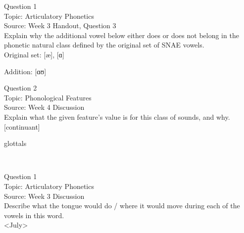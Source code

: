 \documentclass[12pt]{article}
\begin{document}
{\large Question 1}\\

Topic: Articulatory Phonetics\\
Source: Week 3 Handout, Question 3\\

Explain why the additional vowel below either does or does not belong in the phonetic natural class defined by the original set of SNAE vowels.\\

Original set: {[æ]}, {[ɑ]}

Addition: {[ɑʊ]}


\newpage

{\large Question 2}\\

Topic: Phonological Features\\
Source: Week 4 Discussion\\

Explain what the given feature’s value is for this class of sounds, and why.\\

{[continuant]}

glottals


\newpage

\begin{center}
\textbf{{\color{red}{\HUGE END OF EXAM}}}\\

\end{center}
\newpage

\begin{center}
\textbf{{\color{blue}{\HUGE START OF EXAM\\}}}

\textbf{{\color{blue}{\HUGE Student ID: 78380\\}}}

\textbf{{\color{blue}{\HUGE 4:20\\}}}

\end{center}
\newpage

{\large Question 1}\\

Topic: Articulatory Phonetics\\
Source: Week 3 Discussion\\

Describe what the tongue would do / where it would move during each of the vowels in this word.\\

<July>
\end{document}

